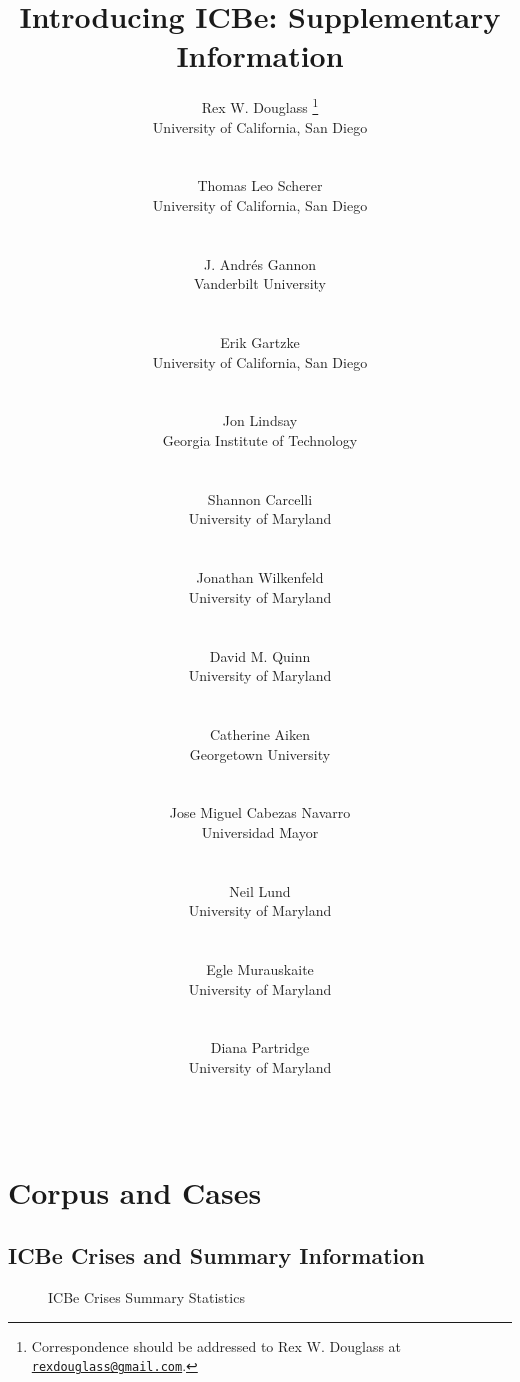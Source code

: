 \documentclass{article}
\title{Introducing ICBe: Supplementary Information}
\author{
    Rex W. Douglass
    \thanks{Correspondence should be addressed to Rex W. Douglass at
\href{mailto:rexdouglass@gmail.com}{\nolinkurl{rexdouglass@gmail.com}}.}
   \\
    University of California, San Diego \\
   \\
  \texttt{} \\
   \And
    Thomas Leo Scherer
   \\
    University of California, San Diego \\
   \\
  \texttt{} \\
   \And
    J. Andrés Gannon
   \\
    Vanderbilt University \\
   \\
  \texttt{} \\
   \And
    Erik Gartzke
   \\
    University of California, San Diego \\
   \\
  \texttt{} \\
   \And
    Jon Lindsay
   \\
    Georgia Institute of Technology \\
   \\
  \texttt{} \\
   \And
    Shannon Carcelli
   \\
    University of Maryland \\
   \\
  \texttt{} \\
   \And
    Jonathan Wilkenfeld
   \\
    University of Maryland \\
   \\
  \texttt{} \\
   \And
    David M. Quinn
   \\
    University of Maryland \\
   \\
  \texttt{} \\
   \And
    Catherine Aiken
   \\
    Georgetown University \\
   \\
  \texttt{} \\
   \And
    Jose Miguel Cabezas Navarro
   \\
    Universidad Mayor \\
   \\
  \texttt{} \\
   \And
    Neil Lund
   \\
    University of Maryland \\
   \\
  \texttt{} \\
   \And
    Egle Murauskaite
   \\
    University of Maryland \\
   \\
  \texttt{} \\
   \And
    Diana Partridge
   \\
    University of Maryland \\
   \\
  \texttt{} \\
  }
\renewenvironment{abstract}{}{}
\begin{document}
\maketitle


\begin{abstract}

\end{abstract}


\newpage
\tableofcontents 
\newpage

\clearpage

\hypertarget{corpus-and-cases}{%
\section{Corpus and Cases}\label{corpus-and-cases}}

\hypertarget{app:crises}{%
\subsection{ICBe Crises and Summary Information}\label{app:crises}}

\begin{figure}[H]
\caption{ICBe Crises Summary Statistics}
\end{figure}
\clearpage
\end{document}

